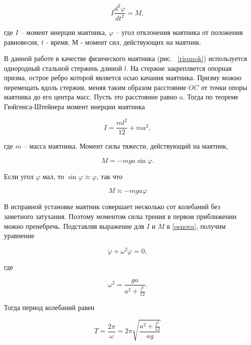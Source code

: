 \documentclass[a4paper,12pt]{article} %
\begin{document}
\begin{equation}
I\frac{d^2\varphi}{dt^2}=M,
\label{osnova}
\end{equation}

\noindent где $ I $ -- момент инерции маятника, $ \varphi $ -- угол отклонения маятника от положения равновесия, $ t $ - время, $ М $ - момент сил, действующих на маятник.

В данной работе в качестве физического маятника (рис.~ \ref{risunok}) используется однородный стальной стержень длиной $ l $. На стержне закрепляется опорная призма, острое ребро которой является осью качания маятника. Призму можно перемещать вдоль стержня, меняя таким образом расстояние $ OC $ от точки опоры маятника до его центра масс. Пусть это расстояние равно $ a $. Тогда по теореме Гюйгенса-Штейнера момент инерции маятника

\begin{equation}
I=\frac{ml^2}{12}+ma^2,
\end{equation}

\noindent где $ m $ -- масса маятника. Момент силы тяжести, действующий на маятник, 

\begin{equation}
M=-mga\sin\varphi.
\end{equation}

\noindent Если угол $ \varphi $ мал, то $ \sin\varphi\approx\varphi $, так что

\begin{equation}
M\approx-mga\varphi
\end{equation}

\noindent В исправной установке маятник совершает несколько сот колебаний без заметного затухания. Поэтому моментом силы трения в первом приближении можно пренебречь. Подставляя выражение для $ I $ и $ M $ в \eqref{osnova}, получим уравнение

\begin{equation}
\ddot{\varphi}+\omega^2\varphi=0,
\label{phi}
\end{equation}

\noindent где

\begin{equation}
\omega^2=\frac{ga}{a^2+\frac{l^2}{12}}.
\end{equation}

Тогда период колебаний равен

\begin{equation}\label{period}
T=\frac{2\pi}{\omega}=2\pi\sqrt{\frac{a^2+\frac{l^2}{12}}{ag}}
\end{equation}
\end{document}
